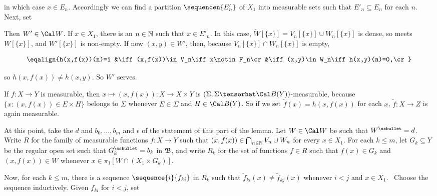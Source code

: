 {

\noindent in which case $x\in E_n$.   Accordingly we can find a partition
$\sequencen{E'_n}$ of $X_1$ into measurable sets such that
$E'_n\subseteq E_n$ for each $n$.   Next, set




\noindent Then $W'\in\Cal W$.
If $x\in X_1$, there is an $n\in\Bbb N$ such that $x\in E'_n$.   In this case,
$\tilde W[\{x\}]=V_n[\{x\}]\cup W_n[\{x\}]$ is dense, so meets $W[\{x\}]$, and
$W'[\{x\}]$ is non-empty.   If now $(x,y)\in W'$, then,
because $V_n[\{x\}]\cap W_n[\{x\}]$ is empty,

$$\eqalign{h(x,f(x))(n)=1
&\iff (x,f(x))\in V_n\iff x\notin F_n\cr
&\iff (x,y)\in W_n\iff h(x,y)(n)=0,\cr}$$

\noindent so $h(x,f(x))\ne h(x,y)$.   So $W'$ serves.\ \Qed

\medskip

 If $f:X\to Y$ is measurable, then
$x\mapsto(x,f(x)):X\to X\times Y$ is
$(\Sigma,\Sigma\tensorhat\Cal B(Y))$-measurable, because
$\{x:(x,f(x))\in E\times H\}$ belongs to $\Sigma$ whenever $E\in\Sigma$ and $H\in\Cal B(Y)$.
So if we set $\tilde f(x)=h(x,f(x))$
for each $x$, $\tilde f:X\to Z$ is again measurable.

At this point, take the $d$ and $b_0,\ldots,b_m$ and $\epsilon$
of the statement of this part of the lemma.
Let $W\in\Cal W$ be such that $W^{\ssbullet}=d$.
Write $R$ for the family of measurable functions $f:X\to Y$ such
that $(x,f(x))\in\bigcap_{n\in\Bbb N}V_n\cup W_n$ for every $x\in X_1$.
For each $k\le m$, let $G_k\subseteq Y$ be the regular open set such that
$G_k^{\ssbullet}=b_k$ in $\frak B$, and write $R_k$
for the set of functions $f\in R$ such that $f(x)\in G_k$ and
$(x,f(x))\in W$ whenever $x\in\pi_1[W\cap(X_1\times G_k)]$.

\medskip

 Now, for each $k\le m$,
there is a sequence $\sequence{i}{f_{ki}}$ in $R_k$
such that $\tilde f_{ki}(x)\ne\tilde f_{kj}(x)$ whenever $i<j$ and
$x\in X_1$.   \Prf\ Choose the sequence inductively.   Given $f_{ki}$ for
$i<j$, set

}
